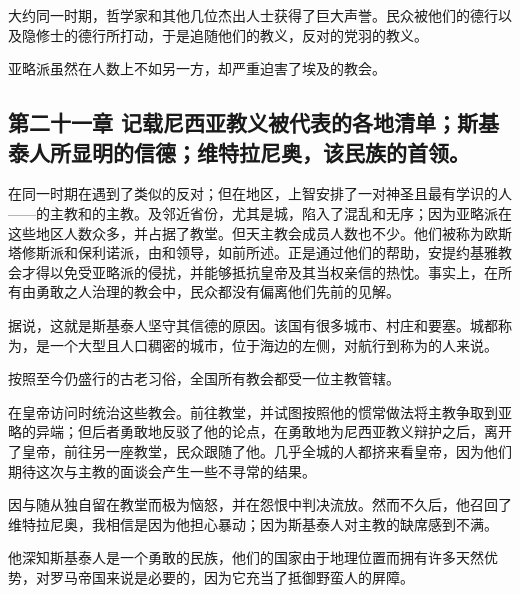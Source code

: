 大约同一时期，哲学家和其他几位杰出人士获得了巨大声誉。民众被他们的德行以及隐修士的德行所打动，于是追随他们的教义，反对的党羽的教义。\par

亚略派虽然在人数上不如另一方，却严重迫害了埃及的教会。\par


\subsection{第二十一章 记载尼西亚教义被代表的各地清单；斯基泰人所显明的信德；维特拉尼奥，该民族的首领。}

在同一时期在遇到了类似的反对；但在地区，上智安排了一对神圣且最有学识的人——的主教和的主教。及邻近省份，尤其是城，陷入了混乱和无序；因为亚略派在这些地区人数众多，并占据了教堂。但天主教会成员人数也不少。他们被称为欧斯塔修斯派和保利诺派，由和领导，如前所述。正是通过他们的帮助，安提约基雅教会才得以免受亚略派的侵扰，并能够抵抗皇帝及其当权亲信的热忱。事实上，在所有由勇敢之人治理的教会中，民众都没有偏离他们先前的见解。\par

据说，这就是斯基泰人坚守其信德的原因。该国有很多城市、村庄和要塞。城都称为，是一个大型且人口稠密的城市，位于海边的左侧，对航行到称为的人来说。\par

按照至今仍盛行的古老习俗，全国所有教会都受一位主教管辖。\par

在皇帝访问时统治这些教会。前往教堂，并试图按照他的惯常做法将主教争取到亚略的异端；但后者勇敢地反驳了他的论点，在勇敢地为尼西亚教义辩护之后，离开了皇帝，前往另一座教堂，民众跟随了他。几乎全城的人都挤来看皇帝，因为他们期待这次与主教的面谈会产生一些不寻常的结果。\par

因与随从独自留在教堂而极为恼怒，并在怨恨中判决流放。然而不久后，他召回了维特拉尼奥，我相信是因为他担心暴动；因为斯基泰人对主教的缺席感到不满。\par

他深知斯基泰人是一个勇敢的民族，他们的国家由于地理位置而拥有许多天然优势，对罗马帝国来说是必要的，因为它充当了抵御野蛮人的屏障。\par


